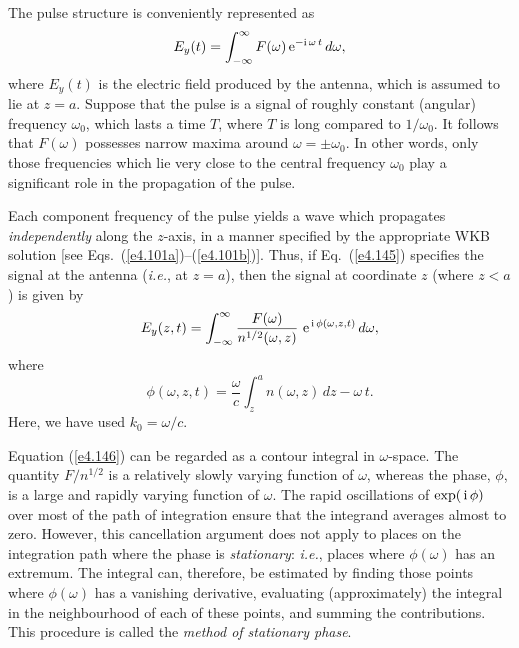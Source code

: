 The pulse structure is conveniently represented as
\begin{equation}\label{e4.145}
E_y(t) = \int_{-\infty}^{\infty} F(\omega)\,{\rm e}^{-{\rm i} \, \omega \,t}\,d\omega,
\end{equation}
where $E_y(t)$ is the electric field produced by
 the antenna, which is assumed to lie at $z=a$. 
Suppose that the pulse is a signal of roughly constant (angular) 
frequency $\omega_0$,
which lasts a time $T$, where $T$  is long compared to $1/\omega_0$. It 
follows  that $F(\omega)$ possesses narrow maxima around $\omega=\pm
\omega_0$. In other words, 
only those frequencies which lie very close to the central
frequency $\omega_0$ play a significant role in the propagation of the pulse. 

Each component frequency of the pulse yields a wave which 
propagates {\em independently}\/ along the $z$-axis, in a manner specified by the
appropriate WKB solution [see Eqs.~(\ref{e4.101a})--(\ref{e4.101b})]. Thus, if Eq.~(\ref{e4.145})
specifies the signal at the antenna ({\em i.e.}, at
$z=a$), then the  signal at coordinate $z$ (where
$z<a$) 
is given by
\begin{equation}\label{e4.146}
E_y(z,t) = \int_{-\infty}^{\infty} \frac{F(\omega)}{n^{1/2}(\omega, z)}\,\,
{\rm e}^{\,{\rm i}\, \phi(\omega, z,t)}\,d\omega,
\end{equation}
where
\begin{equation}
\phi(\omega, z,t) = \frac{\omega}{c} \int_z^{a} \!n(\omega, z)\,dz - \omega \,t.
\end{equation}
Here, we have used $k_0=\omega/c$. 

Equation (\ref{e4.146}) can be regarded as a contour integral in $\omega$-space.
The quantity  $F/n^{1/2}$ is a relatively slowly varying function of
$\omega$, whereas the phase, $\phi$, is a large and rapidly varying
function of $\omega$. 
The rapid
oscillations of $\exp(\,{\rm i}\,\phi)$ over most of the path of
integration ensure that the integrand averages almost to zero. However,
this cancellation argument does not apply to places on the
integration path where the phase
is {\em stationary}: {\em i.e.}, 
 places where $\phi(\omega)$ has an extremum. The integral can, therefore, be
estimated by finding those points where $\phi(\omega)$ has a vanishing derivative,
evaluating (approximately) the integral in the neighbourhood of each of
 these points, and summing the contributions. This procedure is called
the {\em method of stationary phase}.

